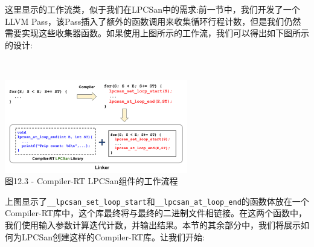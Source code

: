 这里显示的工作流类，似于我们在LPCSan中的需求:前一节中，我们开发了一个LLVM Pass，该Pass插入了额外的函数调用来收集循环行程计数，但是我们仍然需要实现这些收集器函数。如果使用上图所示的工作流，我们可以得出如下图所示的设计:

\hspace*{\fill} \\ %
\begin{center}
\includegraphics[width=0.6\textwidth]{content/3/chapter12/images/3.png}\\
图12.3 - Compiler-RT LPCSan组件的工作流程
\end{center}

上图显示了\texttt{\_\_lpcsan\_set\_loop\_start}和\texttt{\_\_lpcsan\_at\_loop\_end}的函数体放在一个Compiler-RT库中，这个库最终将与最终的二进制文件相链接。在这两个函数中，我们使用输入参数计算迭代计数，并输出结果。本节的其余部分中，我们将展示如何为LPCSan创建这样的Compiler-RT库。让我们开始:

